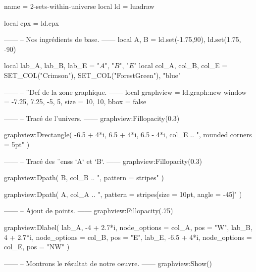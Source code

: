 \documentclass[border = 3pt]{standalone}
\begin{document}
\begin{luadraw*}{name = 2-sets-within-universe}
local ld = luadraw

local cpx = ld.cpx

------
-- Nos ingrédients de base.
------
local A, B = ld.set(-1.75,90), ld.set(1.75, -90)

local lab_A, lab_B, lab_E = "$A$", "$B$", "$E$"
local col_A, col_B, col_E = SET_COL("Crimson"), SET_COL("ForestGreen"), "blue"

------
-- ¨Def de la zone graphique.
------
local graphview = ld.graph:new{
  window = {-7.25, 7.25, -5, 5},
  size   = {10, 10},
  bbox   = false
}

------
-- Tracé de l'univers.
------
graphview:Fillopacity(0.3)

graphview:Drectangle(
  -6.5 + 4*i, 6.5 + 4*i, 6.5 - 4*i,
  col_E .. ", rounded corners = 5pt"
)

------
-- Tracé des ¨enss `A` et `B`.
------
graphview:Fillopacity(0.3)

graphview:Dpath(
  B,
  col_B .. ", pattern = stripes"
)

graphview:Dpath(
  A,
  col_A .. ", pattern = {stripes[size = 10pt, angle = -45]}"
)

------
-- Ajout de points.
------
graphview:Fillopacity(.75)

graphview:Dlabel(
  lab_A, -4 + 2.7*i, {node_options = col_A, pos = "W"},
  lab_B,  4 + 2.7*i, {node_options = col_B, pos = "E"},
  lab_E, -6.5 + 4*i, {node_options = col_E, pos = "NW"}
)

------
-- Montrons le résultat de notre oeuvre.
------
graphview:Show()
\end{luadraw*}
\end{document}
